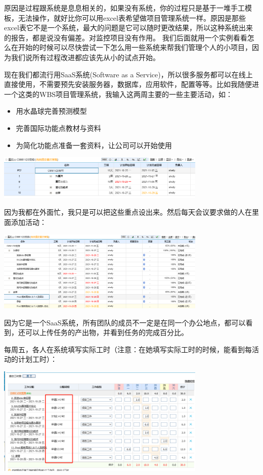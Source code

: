 原因是过程跟系统是息息相关的，如果没有系统，你的过程只是基于一堆手工模板，无法操作，就好比你可以用excel表希望做项目管理系统一样。原因是那些excel表它不是一个系统，最大的问题是它可以随时更改结果，所以这种系统出来的报告，都是说没有偏差。对监控项目没有作用。
我们后面就用一个实例看看怎么在开始的时候可以尽快尝试一下怎么用一些系统来帮我们管理个人的小项目，因为我们说所有过程改进都应该先从小的试点开始。

现在我们都流行用SaaS系统(Software as a
Service)，所以很多服务都可以在线上直接使用，不需要预先安装服务器，数据库，应用软件，配置等等。比如我随便进一个这类的WBS项目管理系统，我输入这两周主要的一些主要活动，如：

\begin{itemize}
\tightlist
\item
  用水晶球完善预测模型
\item
  完善国际功能点教材与资料
\item
  为简化功能点准备一套资料，让公司可以开始使用
\end{itemize}


\includegraphics[width=10cm]{微信截图_20211029132308.jpg}

因为我都在外面忙，我只是可以把这些重点设出来。然后每天会议要求做的人在里面添加活动：

\includegraphics[width=10cm]{微信截图_20211029090316.jpg}

因为它是一个SaaS系统，所有团队的成员不一定是在同一个办公地点，都可以看到，还可以上传任务的产出物，并看到任务的完成百分比。

每周五，各人在系统填写实际工时（注意：在她填写实际工时的时候，能看到每活动的计划工时）：


\includegraphics[width=10cm]{微信截图_20211029090520.jpg}

